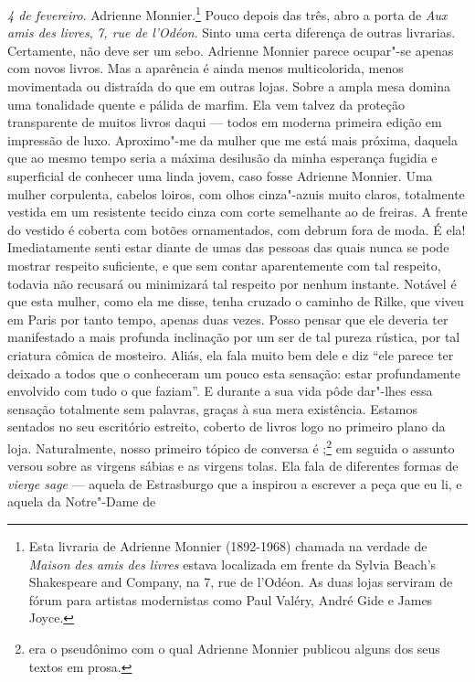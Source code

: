 \emph{4 de fevereiro}. Adrienne Monnier.\footnote{Esta livraria de
  Adrienne Monnier (1892-1968) chamada na verdade de \emph{Maison des
  amis des livres} estava localizada em frente da Sylvia Beach's
  Shakespeare and Company, na 7, rue de l'Odéon. As duas lojas serviram
  de fórum para artistas modernistas como Paul Valéry, André Gide e
  James Joyce. \versal{[N. E.]}} Pouco depois das três, abro a porta de \emph{Aux amis
des livres}, \emph{7, rue de l'Odéon}. Sinto uma certa diferença de
outras livrarias. Certamente, não deve ser um sebo. Adrienne Monnier
parece ocupar"-se apenas com novos livros. Mas a aparência é ainda menos
multicolorida, menos movimentada ou distraída do que em outras lojas.
Sobre a ampla mesa domina uma tonalidade quente e pálida de marfim. Ela
vem talvez da proteção transparente de muitos livros daqui --- todos em
moderna primeira edição em impressão de luxo. Aproximo"-me da mulher que
me está mais próxima, daquela que ao mesmo tempo seria a máxima
desilusão da minha esperança fugidia e superficial de conhecer uma linda
jovem, caso fosse Adrienne Monnier. Uma mulher corpulenta, cabelos
loiros, com olhos cinza"-azuis muito claros, totalmente vestida em um
resistente tecido cinza com corte semelhante ao de freiras. A frente do
vestido é coberta com botões ornamentados, com debrum fora de moda. É
ela! Imediatamente senti estar diante de umas das pessoas das quais
nunca se pode mostrar respeito suficiente, e que sem contar
aparentemente com tal respeito, todavia não recusará ou minimizará tal
respeito por nenhum instante. Notável é que esta mulher, como ela me
disse, tenha cruzado o caminho de Rilke, que viveu em Paris por tanto
tempo, apenas duas vezes. Posso pensar que ele deveria ter manifestado a
mais profunda inclinação por um ser de tal pureza rústica, por tal
criatura cômica de mosteiro. Aliás, ela fala muito bem dele e diz ``ele
parece ter deixado a todos que o conheceram um pouco esta sensação:
estar profundamente envolvido com tudo o que faziam''. E durante a sua
vida pôde dar"-lhes essa sensação totalmente sem palavras, graças à sua
mera existência. Estamos sentados no seu escritório estreito, coberto de
livros logo no primeiro plano da loja. Naturalmente, nosso primeiro
tópico de conversa é ;\footnote{ era o pseudônimo com o
  qual Adrienne Monnier publicou alguns dos seus textos em prosa. \versal{[N. E.]}} em
seguida o assunto versou sobre as virgens sábias e as virgens tolas. Ela
fala de diferentes formas de \emph{vierge sage} --- aquela de Estrasburgo
que a inspirou a escrever a peça que eu li, e aquela da Notre"-Dame de
